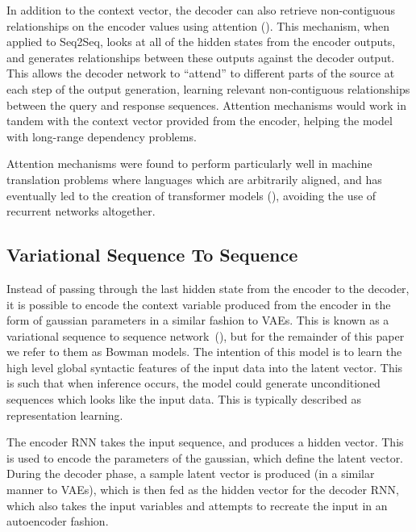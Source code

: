 \documentclass[12pt,twoside]{report}
\begin{document}

In addition to the context vector, the decoder can also retrieve non-contiguous relationships on the encoder values using attention (\cite{bahdanau_neural_2014}). This mechanism, when applied to Seq2Seq,  looks at all of the hidden states from the encoder outputs, and generates  relationships between these outputs against the decoder output. This allows the decoder network to ``attend'' to different parts of the source at each step of the output generation, learning relevant non-contiguous relationships between the query and response sequences. Attention mechanisms would work in tandem with the context vector provided from the encoder, helping the model with long-range dependency problems.

Attention mechanisms were found to perform particularly well in machine translation problems where languages which are arbitrarily aligned, and has eventually led to the creation of transformer models (\cite{vaswani_attention_2017}), avoiding the use of recurrent networks altogether.

\subsection{Variational Sequence To Sequence}
\label{variational_context}

Instead of passing through the last hidden state from the encoder to the decoder, it is possible to encode the context variable produced from the encoder in the form of gaussian parameters in a similar fashion to VAEs. This is known as a variational sequence to sequence network (\cite{bowman_generating_2015}), but for the remainder of this paper we refer to them as Bowman models. The intention of this model is to learn the high level global syntactic features of the input data into the latent vector. This is such that when inference occurs, the model could generate unconditioned sequences which looks like the input data. This is typically described as representation learning.

The encoder RNN takes the input sequence, and produces a hidden vector. This is used to encode the parameters of the gaussian, which define the latent vector. During the decoder phase, a sample latent vector is produced (in a similar manner to VAEs), which is then fed as the hidden vector for the decoder RNN, which also takes the input variables and attempts to recreate the input in an autoencoder fashion.

\end{document}
